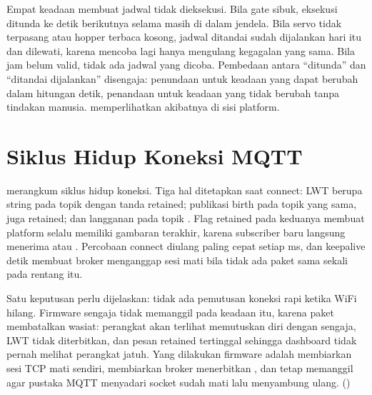Empat keadaan membuat jadwal tidak dieksekusi. Bila gate sibuk, eksekusi ditunda ke
detik berikutnya selama masih di dalam jendela. Bila servo tidak terpasang atau
hopper terbaca kosong, jadwal ditandai sudah dijalankan hari itu dan dilewati,
karena mencoba lagi hanya mengulang kegagalan yang sama. Bila jam belum valid, tidak
ada jadwal yang dicoba. Pembedaan antara ``ditunda'' dan ``ditandai dijalankan''
disengaja: penundaan untuk keadaan yang dapat berubah dalam hitungan detik,
penandaan untuk keadaan yang tidak berubah tanpa tindakan manusia.
 memperlihatkan akibatnya di sisi platform.


\section{Siklus Hidup Koneksi MQTT}

 merangkum siklus hidup koneksi. Tiga hal
ditetapkan saat connect: LWT berupa string  pada topik
 dengan tanda retained; publikasi birth  pada topik yang
sama, juga retained; dan langganan pada topik . Flag retained pada
keduanya membuat platform selalu memiliki gambaran terakhir, karena subscriber baru
langsung menerima  atau . Percobaan connect diulang
paling cepat setiap \RetryMs{} ms, dan keepalive \KeepAliveS{} detik membuat broker
menganggap sesi mati bila tidak ada paket sama sekali pada rentang itu.


Satu keputusan perlu dijelaskan: tidak ada pemutusan koneksi rapi ketika WiFi
hilang. Firmware sengaja tidak memanggil  pada keadaan itu,
karena paket  membatalkan wasiat: perangkat akan terlihat
memutuskan diri dengan sengaja, LWT tidak diterbitkan, dan pesan retained
 tertinggal sehingga dashboard tidak pernah melihat perangkat jatuh.
Yang dilakukan firmware adalah membiarkan sesi TCP mati sendiri, membiarkan broker
menerbitkan , dan tetap memanggil  agar pustaka
MQTT menyadari socket sudah mati lalu menyambung ulang.
()

